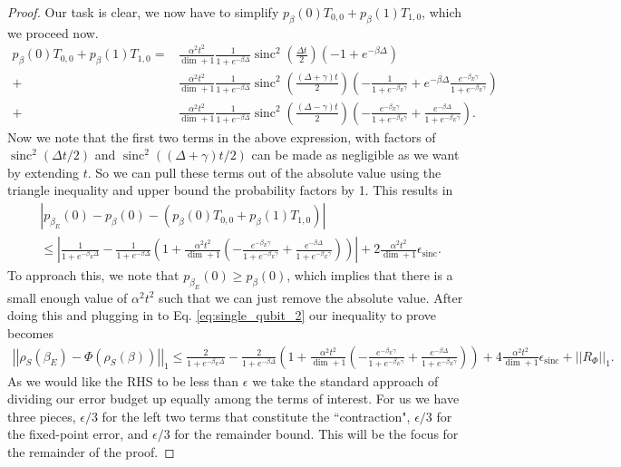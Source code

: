 \documentclass{article}
\newcommand{\parens}[1]{\left( #1 \right)}
\newcommand{\norm}[1]{\left| \left| #1 \right| \right|}
\DeclareMathOperator{\sinc}{sinc}
\begin{document}
\begin{proof}
Our task is clear, we now have to simplify $p_{\beta}(0) T_{0,0} + p_{\beta}(1) T_{1,0}$, which we proceed now. 
\begin{align}
    p_{\beta}(0) T_{0,0} + p_{\beta}(1) T_{1,0} = &\frac{\alpha^2 t^2}{\dim +1} \frac{1}{1 + e^{-\beta \Delta}} \sinc^2\left(\frac{\Delta t}{2}\right)(-1 + e^{-\beta \Delta}) \nonumber \\
    +  &\frac{\alpha^2 t^2}{\dim +1} \frac{1}{1 + e^{-\beta \Delta}}\sinc^2\parens{\frac{(\Delta + \gamma) t}{2}} \left(-\frac{1}{1 + e^{-\beta_E \gamma}} + e^{-\beta \Delta} \frac{e^{-\beta_E \gamma}}{1 + e^{-\beta_E \gamma}} \right) \nonumber \\
    +  &\frac{\alpha^2 t^2}{\dim +1} \frac{1}{1 + e^{-\beta \Delta}}\sinc^2\parens{\frac{(\Delta - \gamma) t}{2}} \left(-\frac{e^{-\beta_E \gamma}}{1 + e^{-\beta_E \gamma}} + \frac{e^{-\beta \Delta}}{1 + e^{-\beta_E \gamma}} \right). \label{eq:single_qubit_4}
\end{align}
Now we note that the first two terms in the above expression, with factors of $\sinc^2(\Delta t/ 2)$ and $\sinc^2((\Delta + \gamma)t/2)$ can be made as negligible as we want by extending $t$. So we can pull these terms out of the absolute value using the triangle inequality and upper bound the probability factors by 1. This results in
\begin{align}
    &\left| p_{\beta_E}(0) - p_{\beta}(0) - (p_{\beta}(0) T_{0, 0} + p_{\beta}(1) T_{1, 0})\right| \nonumber \\
    &\le \left| \frac{1}{1 + e^{-\beta_E \Delta}} - \frac{1}{1 + e^{-\beta \Delta}} \left(1 + \frac{\alpha^2 t^2}{\dim + 1} \left(-\frac{e^{-\beta_E \gamma}}{1 + e^{-\beta_E \gamma}} + \frac{e^{-\beta \Delta}}{1 + e^{-\beta_E \gamma}} \right) \right) \right| + 2 \frac{\alpha^2 t^2}{\dim + 1} \epsilon_{\sinc}.
\end{align}
To approach this, we note that $p_{\beta_E}(0) \ge p_{\beta}(0)$, which implies that there is a small enough value of $\alpha^2 t^2$ such that we can just remove the absolute value. After doing this and plugging in to Eq. \eqref{eq:single_qubit_2} our inequality to prove becomes
\begin{align}
    \norm{\rho_S(\beta_E) - \Phi(\rho_S(\beta))}_1 \le \frac{2}{1 + e^{-\beta_E \Delta}} -  \frac{2}{1 + e^{-\beta \Delta}} \left(1 + \frac{\alpha^2 t^2}{\dim + 1} \left(-\frac{e^{-\beta_E \gamma}}{1 + e^{-\beta_E \gamma}} + \frac{e^{-\beta \Delta}}{1 + e^{-\beta_E \gamma}} \right) \right) + 4 \frac{\alpha^2 t^2}{\dim + 1} \epsilon_{\sinc} + \norm{R_{\Phi}}_1. \label{eq:single_qubit_3}
\end{align}
As we would like the RHS to be less than $\epsilon$ we take the standard approach of dividing our error budget up equally among the terms of interest. For us we have three pieces, $\epsilon / 3$ for the left two terms that constitute the ``contraction", $\epsilon /3 $ for the fixed-point error, and $\epsilon / 3$ for the remainder bound. This will be the focus for the remainder of the proof.


\end{proof}
\end{document}
